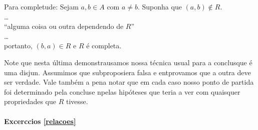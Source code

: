Para completude: Sejam $a,b\in A$ com $a\neq b$. Suponha que $(a,b)\notin R$.
\\
\ldots
\\ 
``alguma coisa ou outra dependendo de $R$''
\\
\ldots
\\
portanto, $(b,a)\in R$ e $R$ \'e completa.

Note que nesta \'ultima demonstra\cao usamos nossa t\'ecnica usual para a conclus\ao que \'e uma disjun\caoi. Assumimos que subproposi\cao era falsa e ent\ao provamos que a outra deve ser verdade. Vale tamb\'em a pena notar que em cada caso nosso ponto de partida foi determinado pela conclus\ao e n\ao pelas hip\'oteses que teria a ver com quaisquer propriedades que $R$ tivesse.

\paragraph{Excerc\ih cios \ref{relacoes}}

